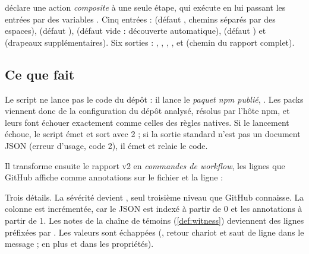  déclare une action \emph{composite} à une seule étape, qui exécute  en lui passant les entrées par des variables . Cinq entrées :  (défaut , chemins séparés par des espaces),  (défaut ),  (défaut vide : découverte automatique),  (défaut ) et  (drapeaux supplémentaires). Six sorties : , , , ,  et  (chemin du rapport complet).

\subsection{Ce que fait }


Le script ne lance pas le code du dépôt : il lance le \emph{paquet npm publié}, . Les packs viennent donc de la configuration du dépôt analysé, résolus par l'hôte npm, et leurs \Error{} font échouer  exactement comme celles des règles natives. Si le lancement échoue, le script émet  et sort avec 2 ; si la sortie standard n'est pas un document JSON (erreur d'usage, code 2), il émet  et relaie le code.

Il transforme ensuite le rapport v2 en \emph{commandes de workflow}, les lignes  que GitHub affiche comme annotations sur le fichier et la ligne :


Trois détails. La sévérité  devient , seul troisième niveau que GitHub connaisse. La colonne est incrémentée, car le JSON est indexé à partir de 0 et les annotations à partir de 1. Les notes de la chaîne de témoins (\cref{def:witness}) deviennent des lignes préfixées par . Les valeurs sont échappées (\code{\%}, retour chariot et saut de ligne dans le message ; en plus \code{:} et \code{,} dans les propriétés).

